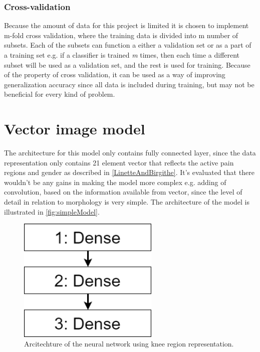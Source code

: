 \subsubsection{Cross-validation}
Because the amount of data for this project is limited it is chosen to implement m-fold cross validation, where the training data is divided into m number of subsets. Each of the subsets can function a either a validation set or as a part of a training set e.g. if a classifier is trained \textit{m} times, then each time a different subset will be used as a validation set, and the rest is used for training. \citep{Duda2000}
Because of the property of cross validation, it can be used as a way of improving generalization accuracy since all data is included during training, but may not be beneficial for every kind of problem. \citep{Duda2000}

\section{Vector image model}
The architecture for this model only contains fully connected layer, since the data representation only contains 21 element vector that reflects the active pain regions and gender as described in \autoref{LinetteAndBirgithe}. It's evaluated that there wouldn't be any gains in making the model more complex e.g. adding of convolution, based on the information available from vector, since the level of detail in relation to morphology is very simple. 
The architecture of the model is illustrated in \autoref{fig:simpleModel}. 

\begin{figure} [H]
\centering
\includegraphics[width=0.6\textwidth]{figures/simpleModel}
\caption{Arcitechture of the neural network using knee region representation.}
\label{fig:simpleModel}  
\end{figure}

